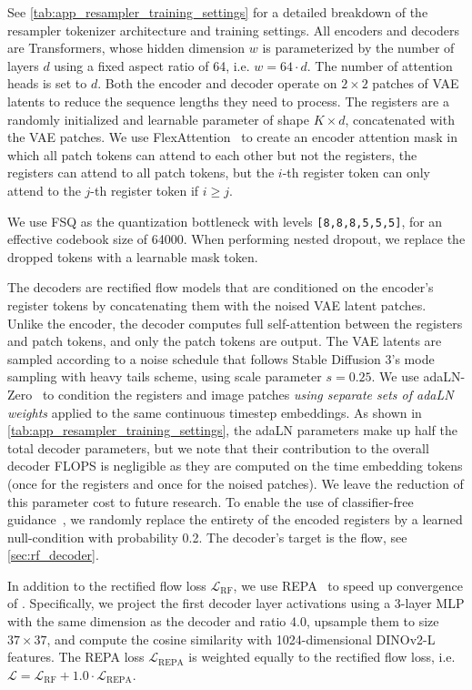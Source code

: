 See \cref{tab:app_resampler_training_settings} for a detailed breakdown of the resampler tokenizer architecture and training settings. All encoders and decoders are Transformers, whose hidden dimension $w$ is parameterized by the number of layers $d$ using a fixed aspect ratio of 64, i.e. $w = 64 \cdot d$. The number of attention heads is set to $d$. Both the encoder and decoder operate on $2 \times 2$ patches of VAE latents to reduce the sequence lengths they need to process. The registers are a randomly initialized and learnable parameter of shape $K \times d$, concatenated with the VAE patches. We use FlexAttention~\cite{flexattention2024} to create an encoder attention mask in which all patch tokens can attend to each other but not the registers, the registers can attend to all patch tokens, but the $i$-th register token can only attend to the $j$-th register token if $i \geq j$.

We use FSQ as the quantization bottleneck with levels \texttt{[8,8,8,5,5,5]}, for an effective codebook size of \num{64000}. When performing nested dropout, we replace the dropped tokens with a learnable mask token. 

The \ours decoders are rectified flow models that are conditioned on the encoder's register tokens by concatenating them with the noised VAE latent patches. Unlike the encoder, the decoder computes full self-attention between the registers and patch tokens, and only the patch tokens are output. The VAE latents are sampled according to a noise schedule that follows Stable Diffusion 3's mode sampling with heavy tails scheme, using scale parameter $s=0.25$. We use adaLN-Zero~\cite{peebles2023scalable} to condition the registers and image patches \textit{using separate sets of adaLN weights} applied to the same continuous timestep embeddings. As shown in \cref{tab:app_resampler_training_settings}, the adaLN parameters make up half the total decoder parameters, but we note that their contribution to the overall decoder FLOPS is negligible as they are computed on the time embedding tokens (once for the registers and once for the noised patches). We leave the reduction of this parameter cost to future research. To enable the use of classifier-free guidance~\cite{Ho2022ClassifierFreeGuidance}, we randomly replace the entirety of the encoded registers by a learned null-condition with probability 0.2. The decoder's target is the flow, see \cref{sec:rf_decoder}.

In addition to the rectified flow loss $\mathcal{L}_\text{RF}$, we use REPA~\cite{Yu2024REPA} to speed up convergence of \ours. Specifically, we project the first decoder layer activations using a 3-layer MLP with the same dimension as the decoder and ratio 4.0, upsample them to size $37 \times 37$, and compute the cosine similarity with 1024-dimensional DINOv2-L~\cite{Oquab2023DINOv2} features. The REPA loss $\mathcal{L}_\text{REPA}$ is weighted equally to the rectified flow loss, i.e. $\mathcal{L} = \mathcal{L}_\text{RF} + 1.0 \cdot \mathcal{L}_\text{REPA}$.

